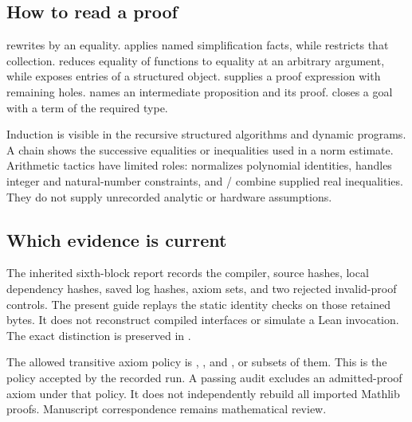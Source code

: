 \subsection{How to read a proof}
 rewrites by an equality.  applies named simplification facts, while  restricts that collection.  reduces equality of functions to equality at an arbitrary argument, while  exposes entries of a structured object.  supplies a proof expression with remaining holes.  names an intermediate proposition and its proof.  closes a goal with a term of the required type.

Induction is visible in the recursive structured algorithms and dynamic programs. A  chain shows the successive equalities or inequalities used in a norm estimate. Arithmetic tactics have limited roles:  normalizes polynomial identities,  handles integer and natural-number constraints, and / combine supplied real inequalities. They do not supply unrecorded analytic or hardware assumptions.

\subsection{Which evidence is current}
The inherited sixth-block report records the compiler, source hashes, local dependency hashes, saved log hashes, axiom sets, and two rejected invalid-proof controls. The present guide replays the static identity checks on those retained bytes. It does not reconstruct compiled interfaces or simulate a Lean invocation. The exact distinction is preserved in .

The allowed transitive axiom policy is , , and , or subsets of them. This is the policy accepted by the recorded run. A passing audit excludes an admitted-proof axiom under that policy. It does not independently rebuild all imported Mathlib proofs. Manuscript correspondence remains mathematical review.
